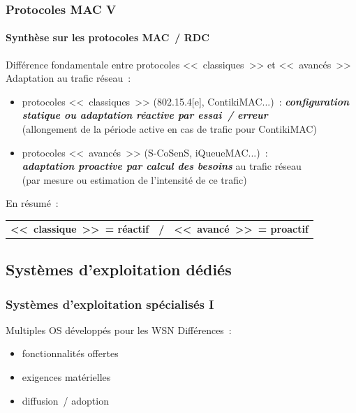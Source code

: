 \documentclass[10pt,c]{beamer}
\renewcommand{\emph}[1]{\textbf{\textit{#1}}}
\begin{document}
\begin{frame}[label=protoMACRDC5]
\frametitle{Protocoles MAC V}
\framesubtitle{Synthèse sur les protocoles MAC~/ RDC}

\vspace{-0.25cm}
\begin{block}{Différence fondamentale entre protocoles <<~classiques~>>
              et <<~avancés~>>}
Adaptation au trafic réseau~:
\begin{itemize}
\item protocoles <<~classiques~>> (802.15.4[e], ContikiMAC...)~:
 \emph{configuration statique ou adaptation réactive par essai~/ erreur} \\
{\footnotesize (allongement de la période active en cas de trafic
  pour ContikiMAC)}
\item protocoles <<~avancés~>> (S-CoSenS, iQueueMAC...)~: \\
 \emph{adaptation proactive par calcul des besoins} au trafic réseau \\
{\footnotesize (par mesure ou estimation de l'intensité de ce trafic)}
\end{itemize}
\end{block}

\vspace{-0.25cm}
\begin{alertblock}{En résumé~:}
\begin{center}
\begin{tabular}{ccc}
\textbf{<<~classique~>>~= réactif} & \textbf{/} &
  \textbf{<<~avancé~>>~= proactif}
\end{tabular}
\end{center}
\end{alertblock}

\end{frame}


\subsection{Systèmes d'exploitation dédiés}

\begin{frame}[label=osDedies1]
\frametitle{Systèmes d'exploitation spécialisés I}

\begin{block}{Multiples OS développés pour les WSN}
Différences~:
\begin{itemize}
\item fonctionnalités offertes
\item exigences matérielles
\item diffusion~/ adoption
\end{itemize}
\end{block}

\end{frame}
\end{document}
